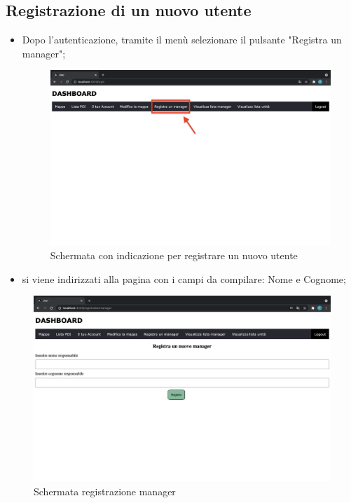 \subsection{Registrazione di un nuovo utente}
\begin{itemize}
    \item Dopo l'autenticazione, tramite il menù selezionare il pulsante "Registra un manager";
    \begin{figure}[H]
        \centering
        \includegraphics[scale=0.12]{res/images/dashboard4.png}
        \caption{Schermata con indicazione per registrare un nuovo utente}
    \end{figure}
    \item si viene indirizzati alla pagina con i campi da compilare: Nome e Cognome;
\end{itemize}
\begin{figure}[H]
    \centering
    \includegraphics[scale=0.12]{res/images/newmanager.png}
    \caption{Schermata registrazione manager}
\end{figure}
